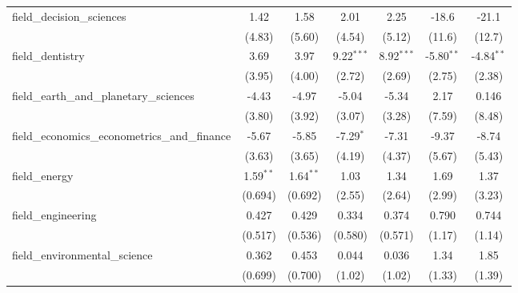 \begin{tabular}{lcccccc}
   field\_decision\_sciences                                   & 1.42          & 1.58          & 2.01          & 2.25          & -18.6        & -21.1\\   
                                                               & (4.83)        & (5.60)        & (4.54)        & (5.12)        & (11.6)       & (12.7)\\   
   field\_dentistry                                            & 3.69          & 3.97          & 9.22$^{***}$  & 8.92$^{***}$  & -5.80$^{**}$ & -4.84$^{**}$\\   
                                                               & (3.95)        & (4.00)        & (2.72)        & (2.69)        & (2.75)       & (2.38)\\   
   field\_earth\_and\_planetary\_sciences                      & -4.43         & -4.97         & -5.04         & -5.34         & 2.17         & 0.146\\   
                                                               & (3.80)        & (3.92)        & (3.07)        & (3.28)        & (7.59)       & (8.48)\\   
   field\_economics\_econometrics\_and\_finance                & -5.67         & -5.85         & -7.29$^{*}$   & -7.31         & -9.37        & -8.74\\   
                                                               & (3.63)        & (3.65)        & (4.19)        & (4.37)        & (5.67)       & (5.43)\\   
   field\_energy                                               & 1.59$^{**}$   & 1.64$^{**}$   & 1.03          & 1.34          & 1.69         & 1.37\\   
                                                               & (0.694)       & (0.692)       & (2.55)        & (2.64)        & (2.99)       & (3.23)\\   
   field\_engineering                                          & 0.427         & 0.429         & 0.334         & 0.374         & 0.790        & 0.744\\   
                                                               & (0.517)       & (0.536)       & (0.580)       & (0.571)       & (1.17)       & (1.14)\\   
   field\_environmental\_science                               & 0.362         & 0.453         & 0.044         & 0.036         & 1.34         & 1.85\\   
                                                               & (0.699)       & (0.700)       & (1.02)        & (1.02)        & (1.33)       & (1.39)\\   

\end{tabular}
